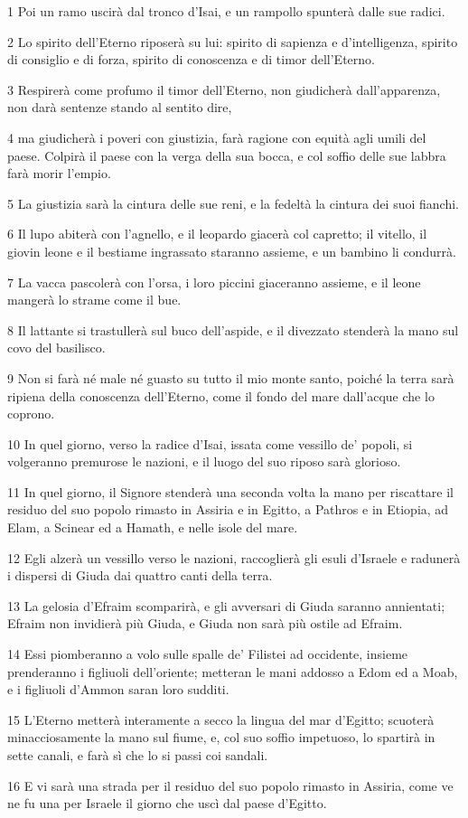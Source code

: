 \par 1 Poi un ramo uscirà dal tronco d'Isai, e un rampollo spunterà dalle sue radici.
\par 2 Lo spirito dell'Eterno riposerà su lui: spirito di sapienza e d'intelligenza, spirito di consiglio e di forza, spirito di conoscenza e di timor dell'Eterno.
\par 3 Respirerà come profumo il timor dell'Eterno, non giudicherà dall'apparenza, non darà sentenze stando al sentito dire,
\par 4 ma giudicherà i poveri con giustizia, farà ragione con equità agli umili del paese. Colpirà il paese con la verga della sua bocca, e col soffio delle sue labbra farà morir l'empio.
\par 5 La giustizia sarà la cintura delle sue reni, e la fedeltà la cintura dei suoi fianchi.
\par 6 Il lupo abiterà con l'agnello, e il leopardo giacerà col capretto; il vitello, il giovin leone e il bestiame ingrassato staranno assieme, e un bambino li condurrà.
\par 7 La vacca pascolerà con l'orsa, i loro piccini giaceranno assieme, e il leone mangerà lo strame come il bue.
\par 8 Il lattante si trastullerà sul buco dell'aspide, e il divezzato stenderà la mano sul covo del basilisco.
\par 9 Non si farà né male né guasto su tutto il mio monte santo, poiché la terra sarà ripiena della conoscenza dell'Eterno, come il fondo del mare dall'acque che lo coprono.
\par 10 In quel giorno, verso la radice d'Isai, issata come vessillo de' popoli, si volgeranno premurose le nazioni, e il luogo del suo riposo sarà glorioso.
\par 11 In quel giorno, il Signore stenderà una seconda volta la mano per riscattare il residuo del suo popolo rimasto in Assiria e in Egitto, a Pathros e in Etiopia, ad Elam, a Scinear ed a Hamath, e nelle isole del mare.
\par 12 Egli alzerà un vessillo verso le nazioni, raccoglierà gli esuli d'Israele e radunerà i dispersi di Giuda dai quattro canti della terra.
\par 13 La gelosia d'Efraim scomparirà, e gli avversari di Giuda saranno annientati; Efraim non invidierà più Giuda, e Giuda non sarà più ostile ad Efraim.
\par 14 Essi piomberanno a volo sulle spalle de' Filistei ad occidente, insieme prenderanno i figliuoli dell'oriente; metteran le mani addosso a Edom ed a Moab, e i figliuoli d'Ammon saran loro sudditi.
\par 15 L'Eterno metterà interamente a secco la lingua del mar d'Egitto; scuoterà minacciosamente la mano sul fiume, e, col suo soffio impetuoso, lo spartirà in sette canali, e farà sì che lo si passi coi sandali.
\par 16 E vi sarà una strada per il residuo del suo popolo rimasto in Assiria, come ve ne fu una per Israele il giorno che uscì dal paese d'Egitto.

